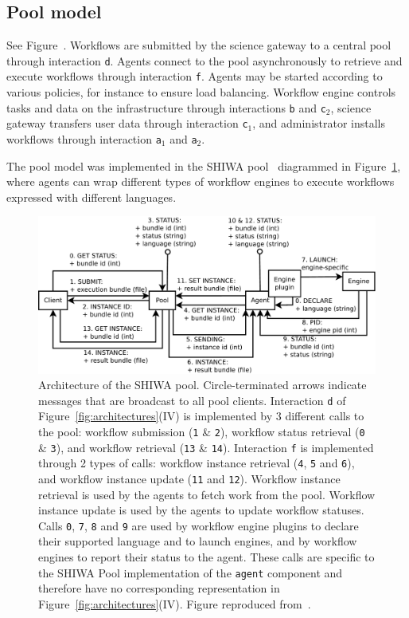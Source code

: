 \documentclass[preprint,3p,twocolumn]{elsarticle}
\begin{document}
\subsection{Pool model}
\label{sec:pool}
See Figure~. Workflows are submitted by the
science gateway to a central pool through interaction
\texttt{d}. Agents connect to the pool asynchronously to retrieve and
execute workflows through interaction \texttt{f}. Agents may be
started according to various policies, for instance to ensure load
balancing. Workflow engine controls tasks and data on the
infrastructure through interactions \texttt{b} and \texttt{c$_2$},
science gateway transfers user data through interaction
\texttt{c$_1$}, and administrator installs workflows through
interaction \texttt{a$_1$} and \texttt{a$_2$}.

The pool model was implemented in the SHIWA pool~\cite{ROGE-13}
diagrammed in Figure~\ref{fig:shiwa-pool-architecture}, where agents
can wrap different types of workflow engines to execute workflows
expressed with different languages.



\begin{figure}
\centering
\includegraphics[width=1.5\columnwidth]{figures/pool-interactions.pdf}
\caption{Architecture of the SHIWA pool. Circle-terminated arrows
  indicate messages that are broadcast to all pool
  clients. Interaction \texttt{d} of Figure~\ref{fig:architectures}(IV) is
  implemented by 3 different calls to the pool: workflow
  submission (\texttt{1} \& \texttt{2}), workflow status retrieval
  (\texttt{0} \& \texttt{3}), and workflow
  retrieval (\texttt{13} \& \texttt{14}). Interaction
  \texttt{f} is implemented through 2 types of calls: workflow
  instance retrieval (\texttt{4}, \texttt{5} and \texttt{6}), and
  workflow instance update (\texttt{11} and \texttt{12}). Workflow
  instance retrieval is used by the agents to fetch work from the
  pool. Workflow instance update is used by the agents to update
  workflow statuses.  Calls \texttt{0}, \texttt{7}, \texttt{8} and
  \texttt{9} are used by
  workflow engine plugins to declare their supported language and to
  launch engines, and by workflow engines to report their status to
  the agent. These calls are specific to the SHIWA Pool implementation
  of the \texttt{agent} component and therefore have no corresponding
  representation in Figure~\ref{fig:architectures}(IV). Figure reproduced
  from~\cite{ROGE-13}.}
\label{fig:shiwa-pool-architecture}
\end{figure}
\end{document}
